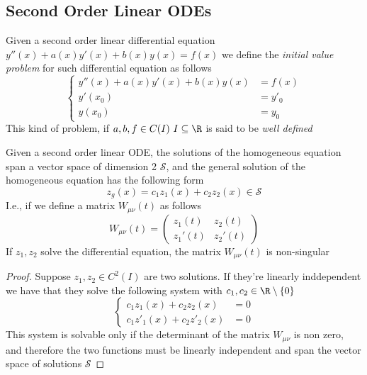 \documentclass[../mmf.tex]{subfiles}
\begin{document}
\subsection{Second Order Linear ODEs}
\begin{dfn}
	Given a second order linear differential equation $y''(x)+a(x)y'(x)+b(x)y(x)=f(x)$ we define the \textit{initial value problem} for such differential equation as follows
	\begin{equation*}
		\left\{ \begin{aligned}
				y''(x)+a(x)y'(x)+b(x)y(x)&=f(x)\\
				y'(x_0)&=y'_0\\
				y(x_0)&=y_0
		\end{aligned}\right.
	\end{equation*}
	This kind of problem, if $a,b,f\in C(I)\ I\subseteq\R$ is said to be \textit{well defined}
\end{dfn}
\begin{thm}
	Given a second order linear ODE, the solutions of the homogeneous equation span a vector space of dimension 2 $\mathcal{S}$, and the general solution of the homogeneous equation has the following form
	\begin{equation*}
		z_g(x)=c_1z_1(x)+c_2z_2(x)\in\mathcal{S}
	\end{equation*}
	I.e., if we define a matrix $W_{\mu\nu}(t)$ as follows
	\begin{equation*}
		W_{\mu\nu}(t)=\begin{pmatrix}z_1(t)&z_2(t)\\z_1'(t)&z_2'(t)\end{pmatrix}
	\end{equation*}
	If $z_1,z_2$ solve the differential equation, the matrix $W_{\mu\nu}(t)$ is non-singular
\end{thm}
\begin{proof}
	Suppose $z_1,z_2\in C^2(I)$ are two solutions. If they're linearly inddependent we have that they solve the following system with $c_1,c_2\in\R\setminus\{0\}$
	\begin{equation*}
		\left\{ \begin{aligned}
				c_1z_1(x)+c_2z_2(x)&=0\\
				c_1z'_1(x)+c_2z'_2(x)&=0
		\end{aligned}\right.
	\end{equation*}
	This system is solvable only if the determinant of the matrix $W_{\mu\nu}$ is non zero, and therefore the two functions must be linearly independent and span the vector space of solutions $\mathcal{S}$
\end{proof}
\end{document}
